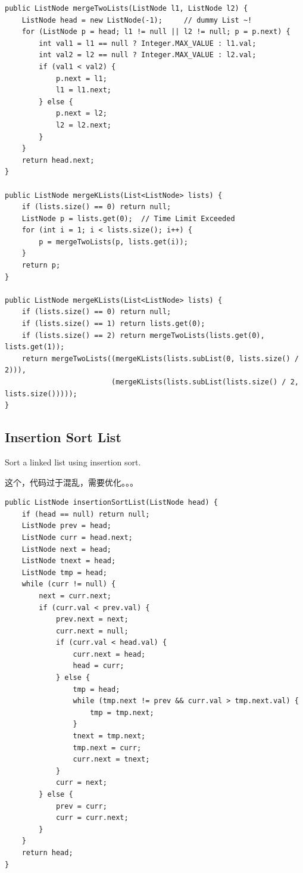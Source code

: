 \documentclass[12pt]{book}
\begin{document}
\lstset{language=java,label= ,caption= ,numbers=none}
\begin{lstlisting}
public ListNode mergeTwoLists(ListNode l1, ListNode l2) {
    ListNode head = new ListNode(-1);     // dummy List ~!
    for (ListNode p = head; l1 != null || l2 != null; p = p.next) {
        int val1 = l1 == null ? Integer.MAX_VALUE : l1.val;
        int val2 = l2 == null ? Integer.MAX_VALUE : l2.val;
        if (val1 < val2) {
            p.next = l1;
            l1 = l1.next;
        } else {
            p.next = l2;
            l2 = l2.next;
        }
    }
    return head.next;
}

public ListNode mergeKLists(List<ListNode> lists) {
    if (lists.size() == 0) return null;
    ListNode p = lists.get(0);  // Time Limit Exceeded
    for (int i = 1; i < lists.size(); i++) {
        p = mergeTwoLists(p, lists.get(i));
    }
    return p;
}

public ListNode mergeKLists(List<ListNode> lists) {
    if (lists.size() == 0) return null;
    if (lists.size() == 1) return lists.get(0);
    if (lists.size() == 2) return mergeTwoLists(lists.get(0), lists.get(1));
    return mergeTwoLists((mergeKLists(lists.subList(0, lists.size() / 2))),
                         (mergeKLists(lists.subList(lists.size() / 2, lists.size()))));
}
\end{lstlisting}

\subsection{Insertion Sort List}
\label{sec-7-3-2}
Sort a linked list using insertion sort.

这个，代码过于混乱，需要优化。。。

\lstset{language=java,label= ,caption= ,numbers=none}
\begin{lstlisting}
public ListNode insertionSortList(ListNode head) {
    if (head == null) return null;
    ListNode prev = head;
    ListNode curr = head.next;
    ListNode next = head;
    ListNode tnext = head;
    ListNode tmp = head;
    while (curr != null) {
        next = curr.next;
        if (curr.val < prev.val) {
            prev.next = next;
            curr.next = null;
            if (curr.val < head.val) {
                curr.next = head;
                head = curr;
            } else {
                tmp = head;
                while (tmp.next != prev && curr.val > tmp.next.val) {
                    tmp = tmp.next;
                }
                tnext = tmp.next;
                tmp.next = curr;
                curr.next = tnext;
            }
            curr = next;
        } else {
            prev = curr;
            curr = curr.next;
        }
    }
    return head;
}
\end{lstlisting}
\end{document}
